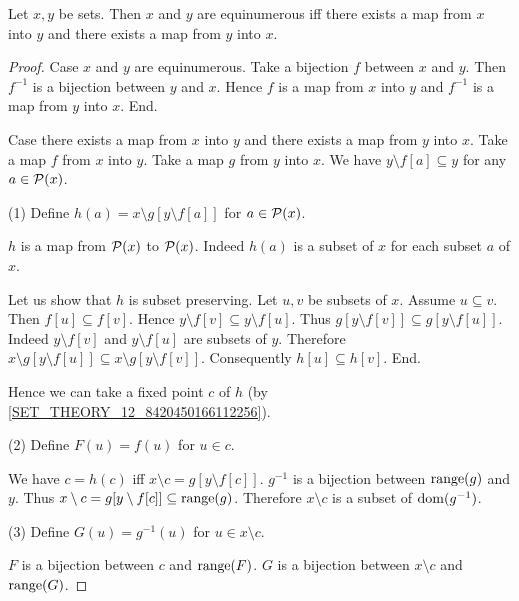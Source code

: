 \documentclass[../set-theory.tex]{subfiles}
\begin{document}
  \begin{forthel}
    \begin{theorem}
      Let $x, y$ be sets.
      Then $x$ and $y$ are equinumerous iff there exists a map from $x$ into $y$
      and there exists a map from $y$ into $x$.
    \end{theorem}
    \begin{proof}
      Case $x$ and $y$ are equinumerous.
        Take a bijection $f$ between $x$ and $y$.
        Then $f^{-1}$ is a bijection between $y$ and $x$.
        Hence $f$ is a map from $x$ into $y$ and $f^{-1}$ is a map from $y$ into
        $x$.
      End.

      Case there exists a map from $x$ into $y$ and there exists a map from $y$
      into $x$.
        Take a map $f$ from $x$ into $y$.
        Take a map $g$ from $y$ into $x$.
        We have $y \setminus f[a] \subseteq y$ for any $a \in \mathcal{P}(x)$.

        (1) Define $h(a) = x \setminus g[y \setminus f[a]]$ for $a \in \mathcal{P}(x)$.

        $h$ is a map from $\mathcal{P}(x)$ to $\mathcal{P}(x)$.
        Indeed $h(a)$ is a subset of $x$ for each subset $a$ of $x$.

        Let us show that $h$ is subset preserving.
          Let $u, v$ be subsets of $x$.
          Assume $u \subseteq v$.
          Then $f[u] \subseteq f[v]$.
          Hence $y \setminus f[v] \subseteq y \setminus f[u]$.
          Thus $g[y \setminus f[v]] \subseteq g[y \setminus f[u]]$.
          Indeed $y \setminus f[v]$ and $y \setminus f[u]$ are subsets of $y$.
          Therefore $x \setminus g[y \setminus f[u]] \subseteq
          x \setminus g[y \setminus f[v]]$.
          Consequently $h[u] \subseteq h[v]$.
        End.

        Hence we can take a fixed point $c$ of $h$ (by
        \cref{SET_THEORY_12_8420450166112256}).

        (2) Define $F(u) = f(u)$ for $u \in c$.

        We have $c = h(c)$ iff $x \setminus c = g[y \setminus f[c]]$.
        $g^{-1}$ is a bijection between $\operatorname{range}(g)$ and $y$.
        Thus $x \setminus c = g[y \setminus f[c]] \subseteq \operatorname{range}(g)$.
        Therefore $x \setminus c$ is a subset of $\operatorname{dom}(g^{-1})$.

        (3) Define $G(u) = g^{-1}(u)$ for $u \in x \setminus c$.

        $F$ is a bijection between $c$ and $\operatorname{range}(F)$.
        $G$ is a bijection between $x \setminus c$ and $\operatorname{range}(G)$.


\end{proof}
\end{forthel}
\end{document}

